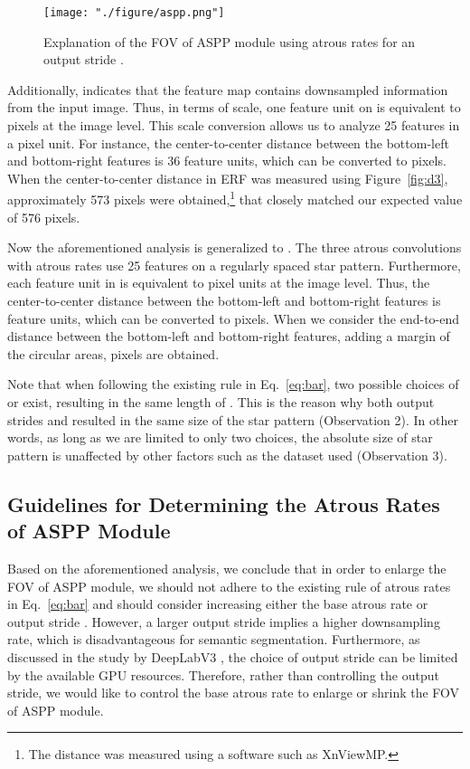 \documentclass{article}
\def\figref#1{Figure~\ref{#1}}
\def\eqref#1{Eq.~\ref{#1}}
\begin{document}
\begin{figure}[t!]
	\centering
	\texttt{[image: "./figure/aspp.png"]}
	\caption{Explanation of the FOV of ASPP module using atrous rates  for an output stride .}
	\label{fig:aspp}
\end{figure}

Additionally,  indicates that the feature map  contains  downsampled information from the input image. Thus, in terms of scale, one feature unit on  is equivalent to  pixels at the image level. This scale conversion allows us to analyze 25 features in a pixel unit. For instance, the center-to-center distance between the bottom-left and bottom-right features is 36 feature units, which can be converted to  pixels. When the center-to-center distance in ERF was measured using \figref{fig:d3}, approximately 573 pixels were obtained,\footnote{The distance was measured using a software such as XnViewMP.} that closely matched our expected value of 576 pixels.

Now the aforementioned analysis is generalized to . The three atrous convolutions with atrous rates  use 25 features on a regularly spaced star pattern. Furthermore, each feature unit in  is equivalent to  pixel units at the image level. Thus, the center-to-center distance between the bottom-left and bottom-right features is  feature units, which can be converted to  pixels. When we consider the end-to-end distance between the bottom-left and bottom-right features, adding a margin  of the circular areas,  pixels are obtained.

Note that when following the existing rule in \eqref{eq:bar}, two possible choices of  or  exist, resulting in the same length of . This is the reason why both output strides  and  resulted in the same size of the star pattern (Observation 2). In other words, as long as we are limited to only two choices, the absolute size of star pattern is unaffected by other factors such as the dataset used (Observation 3).

\subsection{Guidelines for Determining the Atrous Rates of ASPP Module}
Based on the aforementioned analysis, we conclude that in order to enlarge the FOV of ASPP module, we should not adhere to the existing rule of atrous rates in \eqref{eq:bar} and should consider increasing either the base atrous rate  or output stride . However, a larger output stride implies a higher downsampling rate, which is disadvantageous for semantic segmentation. Furthermore, as discussed in the study by DeepLabV3 \citep{DBLP:journals/corr/ChenPSA17}, the choice of output stride can be limited by the available GPU resources. Therefore, rather than controlling the output stride, we would like to control the base atrous rate to enlarge or shrink the FOV of ASPP module.
\end{document}
